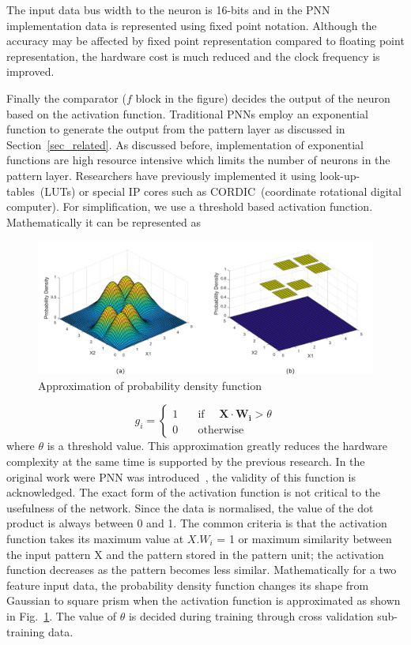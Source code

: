 The input data bus width to the neuron is 16-bits and in the PNN implementation data is represented using fixed point notation.
Although the accuracy may be affected by fixed point representation compared to floating point representation, the hardware cost is much reduced and the clock frequency is improved.

Finally the comparator ($f$ block in the figure) decides the output of the neuron based on the activation function.
Traditional PNNs employ an exponential function to generate the output from the pattern layer as discussed in Section~\ref{sec_related}.
As discussed before, implementation of exponential functions are high resource intensive which limits the number of neurons in the pattern layer.
Researchers have previously implemented it using look-up-tables~(LUTs) or special IP cores such as CORDIC~(coordinate rotational digital computer).
For simplification, we use a threshold based activation function.
Mathematically it can be represented as


\begin{figure}[t]
\centering
   \includegraphics[height=0.45\columnwidth]{Figures/pdf.pdf}
   \caption{Approximation of probability density function}
   \label{fig:pdf}
\end{figure}

\begin{equation}
\label{e2}
 g_{i}=
  \begin{cases}
    1       & \quad \text{if } \quad {\boldsymbol{X\cdot W_{i}}} > \theta \\
    0  & \quad \text{otherwise} 
  \end{cases}
\end{equation}
where $\theta$ is a threshold value.
This approximation greatly reduces the hardware complexity at the same time is supported by the previous research.
In the original work were PNN was introduced~\citep{specht1990}, the validity of this function is acknowledged.
The exact form of the activation function is not critical to the usefulness of the network. 
Since the data is normalised, the value of the dot product is always between 0 and 1.
The common criteria is that the activation function takes its maximum value at $X.W_i$ = 1 or maximum similarity between the input pattern X and the pattern stored in the pattern unit; the activation function decreases as the pattern becomes less similar.
Mathematically for a two feature input data, the probability density function changes its shape from Gaussian to square prism when the activation function is approximated as shown in Fig.~\ref{fig:pdf}.
The value of $\theta$ is decided during training through cross validation sub-training data.

